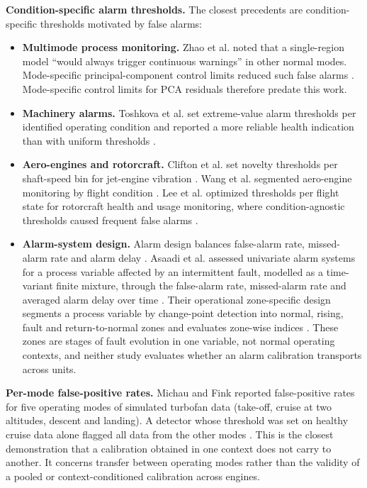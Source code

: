 \documentclass[preprint,11pt,a4paper]{elsarticle}
\begin{document}
\textbf{Condition-specific alarm thresholds.} The closest precedents are condition-specific thresholds motivated by false alarms:
\begin{itemize}
\item \textbf{Multimode process monitoring.} Zhao et al. noted that a single-region model ``would always trigger continuous warnings'' in other normal modes. Mode-specific principal-component control limits reduced such false alarms \cite{N8}. Mode-specific control limits for PCA residuals therefore predate this work.
\item \textbf{Machinery alarms.} Toshkova et al. set extreme-value alarm thresholds per identified operating condition and reported a more reliable health indication than with uniform thresholds \cite{N22}.
\item \textbf{Aero-engines and rotorcraft.} Clifton et al. set novelty thresholds per shaft-speed bin for jet-engine vibration \cite{N27}. Wang et al. segmented aero-engine monitoring by flight condition \cite{N25}. Lee et al. optimized thresholds per flight state for rotorcraft health and usage monitoring, where condition-agnostic thresholds caused frequent false alarms \cite{N26}.
\item \textbf{Alarm-system design.} Alarm design balances false-alarm rate, missed-alarm rate and alarm delay \cite{N32}. Asaadi et al. assessed univariate alarm systems for a process variable affected by an intermittent fault, modelled as a time-variant finite mixture, through the false-alarm rate, missed-alarm rate and averaged alarm delay over time \cite{N39}. Their operational zone-specific design segments a process variable by change-point detection into normal, rising, fault and return-to-normal zones and evaluates zone-wise indices \cite{N40}. These zones are stages of fault evolution in one variable, not normal operating contexts, and neither study evaluates whether an alarm calibration transports across units.
\end{itemize}

\textbf{Per-mode false-positive rates.} Michau and Fink reported false-positive rates for five operating modes of simulated turbofan data (take-off, cruise at two altitudes, descent and landing). A detector whose threshold was set on healthy cruise data alone flagged all data from the other modes \cite{N23}. This is the closest demonstration that a calibration obtained in one context does not carry to another. It concerns transfer between operating modes rather than the validity of a pooled or context-conditioned calibration across engines.
\end{document}
